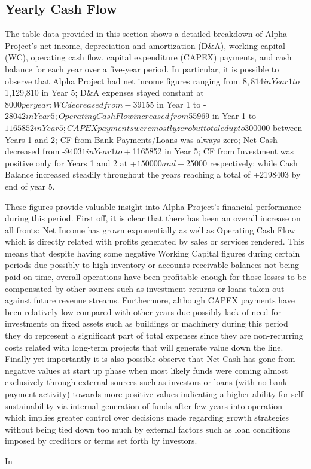 

\subsection{Yearly Cash Flow}\label{sec:title}

The table data provided in this section shows a detailed breakdown of Alpha Project's net income, depreciation and amortization (D\&A), working capital (WC), operating cash flow, capital expenditure (CAPEX) payments, and cash balance for each year over a five-year period.  In particular, it is possible to observe that Alpha Project had net income figures ranging from $8,814 in Year 1 to $1,129,810 in Year 5; D\&A expenses stayed constant at $8000 per year; WC decreased from -$39155 in Year 1 to -$28042 in Year 5; Operating Cash Flow increased from $55969 in Year 1 to $1165852 in Year 5; CAPEX payments were mostly zero but totaled up to $300000 between Years 1 and 2; CF from Bank Payments/Loans was always zero; Net Cash decreased from -$94031 in Year 1 to +$1165852 in Year 5; CF from Investment was positive only for Years 1 and 2 at +$150000 and +$25000 respectively; while Cash Balance increased steadily throughout the years reaching a total of +2198403 by end of year 5. 

These figures provide valuable insight into Alpha Project's financial performance during this period. First off, it is clear that there has been an overall increase on all fronts: Net Income has grown exponentially as well as Operating Cash Flow which is directly related with profits generated by sales or services rendered. This means that despite having some negative Working Capital figures during certain periods due possibly to high inventory or accounts receivable balances not being paid on time, overall operations have been profitable enough for those losses to be compensated by other sources such as investment returns or loans taken out against future revenue streams. Furthermore, although CAPEX payments have been relatively low compared with other years due possibly lack of need for investments on fixed assets such as buildings or machinery during this period they do represent a significant part of total expenses since they are non-recurring costs related with long-term projects that will generate value down the line. Finally yet importantly it is also possible observe that Net Cash has gone from negative values at start up phase when most likely funds were coming almost exclusively through external sources such as investors or loans (with no bank payment activity) towards more positive values indicating a higher ability for self-sustainability via internal generation of funds after few years into operation which implies greater control over decisions made regarding growth strategies without being tied down too much by external factors such as loan conditions imposed by creditors or terms set forth by investors. 

In